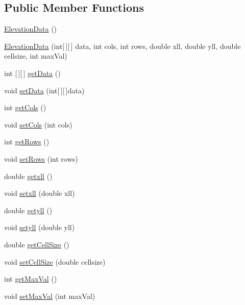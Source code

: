 \subsection*{Public Member Functions}
\begin{DoxyCompactItemize}
\item 
\hyperlink{classbridges_1_1data__src__dependent_1_1_elevation_data_aee584cdeb39194b0fd82f91f1281c989}{Elevation\+Data} ()
\item 
\hyperlink{classbridges_1_1data__src__dependent_1_1_elevation_data_a5bb0de11a5d9d9564431aff839c5bb85}{Elevation\+Data} (int\mbox{[}$\,$\mbox{]}\mbox{[}$\,$\mbox{]} data, int cols, int rows, double xll, double yll, double cellsize, int max\+Val)
\item 
int \mbox{[}$\,$\mbox{]}\mbox{[}$\,$\mbox{]} \hyperlink{classbridges_1_1data__src__dependent_1_1_elevation_data_ab7847f85409b8af94b85ea7023a46b2d}{get\+Data} ()
\item 
void \hyperlink{classbridges_1_1data__src__dependent_1_1_elevation_data_ab216aa7c25304cacac96a976ab79748b}{set\+Data} (int\mbox{[}$\,$\mbox{]}\mbox{[}$\,$\mbox{]}data)
\item 
int \hyperlink{classbridges_1_1data__src__dependent_1_1_elevation_data_aecd53a0d628fc595ce7f45d5cdd0d5c9}{get\+Cols} ()
\item 
void \hyperlink{classbridges_1_1data__src__dependent_1_1_elevation_data_a13b37ddf4aaddba84aaf047f0371032e}{set\+Cols} (int cols)
\item 
int \hyperlink{classbridges_1_1data__src__dependent_1_1_elevation_data_a06732017ff4427e36ecf583155a776fd}{get\+Rows} ()
\item 
void \hyperlink{classbridges_1_1data__src__dependent_1_1_elevation_data_a10c6df66f391797f389d97084bbf5ac3}{set\+Rows} (int rows)
\item 
double \hyperlink{classbridges_1_1data__src__dependent_1_1_elevation_data_a2a4af898ef5d7f5fefe09efcfb520850}{getxll} ()
\item 
void \hyperlink{classbridges_1_1data__src__dependent_1_1_elevation_data_a75ad5cc47b65deadc5905820c7c1749d}{setxll} (double xll)
\item 
double \hyperlink{classbridges_1_1data__src__dependent_1_1_elevation_data_a3dbade4bcd0a18c967bea1291d4a7be1}{getyll} ()
\item 
void \hyperlink{classbridges_1_1data__src__dependent_1_1_elevation_data_a5a047e02c5d0acf9bf6d4b45086ae1cc}{setyll} (double yll)
\item 
double \hyperlink{classbridges_1_1data__src__dependent_1_1_elevation_data_a7fba378d6a2c9f4e9723bd07fa697902}{get\+Cell\+Size} ()
\item 
void \hyperlink{classbridges_1_1data__src__dependent_1_1_elevation_data_a504abfe58c55baff68e7b1d17ae991e5}{set\+Cell\+Size} (double cellsize)
\item 
int \hyperlink{classbridges_1_1data__src__dependent_1_1_elevation_data_a041124e8005f06ad475627b1abd75c4e}{get\+Max\+Val} ()
\item 
void \hyperlink{classbridges_1_1data__src__dependent_1_1_elevation_data_a1942cae209312b44dac10436966eb4d0}{set\+Max\+Val} (int max\+Val)
\end{DoxyCompactItemize}


